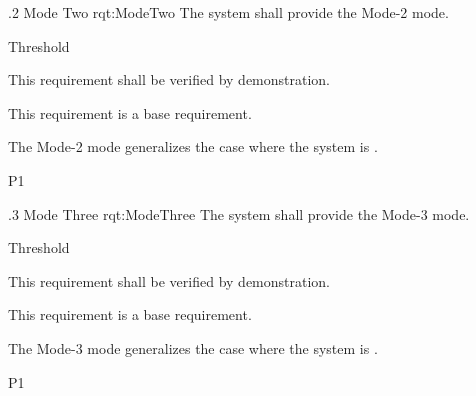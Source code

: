 \ONERQMTV
{\RqtNumberBase.2}
{Mode Two}
{rqt:ModeTwo}
{The system shall provide the Mode-2 mode.}
{
	\item [Phase 1] Threshold
}
{This requirement shall be verified by demonstration.}
{
	\item [N/A] This requirement is a base requirement.
}
{
	\item The Mode-2 mode generalizes the case where the system is \TBD.
}
{P1}


\ONERQMTV
{\RqtNumberBase.3}
{Mode Three}
{rqt:ModeThree}
{The system shall provide the Mode-3 mode.}
{
	\item [Phase 1] Threshold
}
{This requirement shall be verified by demonstration.}
{
	\item [N/A] This requirement is a base requirement.
}
{
	\item The Mode-3 mode generalizes the case where the system is \TBD.
}
{P1}
